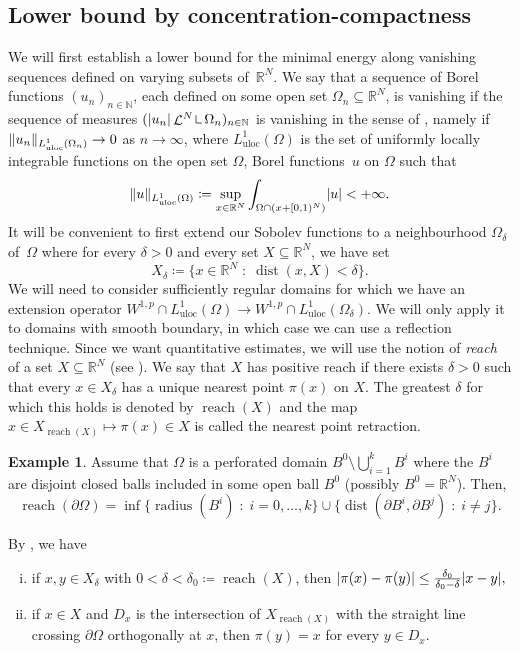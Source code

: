 \documentclass[10pt]{amsart}
\theoremstyle{plain}
\theoremstyle{definition}
\newtheorem{example}[theorem]{Example}
\newcommand{\N}{\mathbb{N}}
\newcommand{\R}{\mathbb{R}}
\newcommand{\mres}{\mathop{\hbox{\vrule height 6pt width .5pt depth 0pt \vrule height .5pt width 4pt depth 0pt}}\nolimits}
\newcommand{\uloc}{L^1_\mathrm{uloc}}
\newcommand{\st}{\;:\;}
\DeclarePairedDelimiter{\abs}{\lvert}{\rvert}
\DeclarePairedDelimiter{\norm}{\lVert}{\rVert}
\DeclareMathOperator{\lbm}{\mathcal{L}}
\DeclareMathOperator{\dist}{dist}
\DeclareMathOperator{\reach}{reach}
\begin{document}
\subsection{Lower bound by concentration-compactness}

We will first establish a lower bound for the minimal energy along vanishing sequences defined on varying subsets of~\(\R^N\). We say that a sequence of Borel functions \((u_n)_{n\in\N}\), each defined on some open set \(\Omega_n\subseteq\R^N\), is vanishing if the sequence of measures \((\abs{u_n}\lbm^N \mres \Omega_n)_{n\in\N}\) is vanishing in the sense of , namely if \(\norm{u_n}_{\uloc({\Omega}_n)}\to 0\) as \(n\to\infty\), where \(\uloc({\Omega})\) is the set of uniformly locally integrable functions on the open set \(\Omega\), \ie Borel functions~$u$ on $\Omega$ such that
\begin{equation}
\norm{u}_{\uloc({\Omega})}\coloneqq\sup_{x\in \R^N} \int_{\Omega\cap (x+[0,1)^N)}\abs{u}<+\infty.
\end{equation}
It will be convenient to first extend our Sobolev functions to a neighbourhood \(\Omega_\delta\) of~\(\Omega\) where for every \(\delta>0\) and every set \(X\subseteq\R^N\), we have set
\[
X_\delta\coloneqq\{x\in\R^N\st\dist(x,X)<\delta\}.
\]
We will need to consider sufficiently regular domains for which we have an extension operator \(W^{1,p}\cap \uloc (\Omega)\to W^{1,p}\cap \uloc(\Omega_\delta)\). We will only apply it to domains with smooth boundary, in which case we can use a reflection technique. Since we want quantitative estimates, we will use the notion of \emph{reach} of a set \(X\subseteq\R^N\) (see \cite{federerCurvatureMeasures1959}). We say that \(X\) has positive reach if there exists \(\delta>0\) such that every \(x\in X_\delta\) has a unique nearest point \(\pi(x)\) on \(X\). The greatest \(\delta\) for which this holds is denoted by \(\reach(X)\) and the map \(x\in X_{\reach(X)}\mapsto\pi(x)\in X\) is called the nearest point retraction.
\begin{example}\label{perforatedDomain}
Assume that \(\Omega\) is a perforated domain \(B^0\setminus \bigcup_{i=1}^k B^i\) where the \(B^i\) are disjoint closed balls included in some open ball \(B^0\) (possibly \(B^0=\R^N\)). Then,
\[
\reach(\partial\Omega)=
\inf\{\operatorname{radius}(B^i)\st i=0,\dots,k\}
\cup\{\dist(\partial B^i,\partial B^j)\st i\neq j\}.
\]
\end{example}

By \cite[Th.\,4.8]{federerCurvatureMeasures1959}, we have
\begin{enumerate}[(i),leftmargin=\normalparindent]
\item\label{lipschitzProjection} if \(x,y\in X_\delta\) with \(0<\delta<\delta_0\coloneqq\reach(X)\), then
\(
\abs{\pi(x)-\pi(y)}\leq \frac{\delta_0}{\delta_0-\delta}\abs{x-y},
\)
\item\label{orthogonalProjection}
if \(x\in X\) and \(D_x\) is the intersection of \(X_{\reach(X)}\) with the straight line crossing \(\partial\Omega\) orthogonally at \(x\), then
\(\pi(y)= x\) for every \(y\in D_x\).
\end{enumerate}
\end{document}
